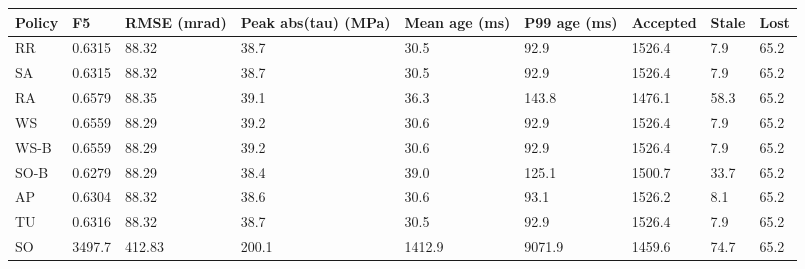\begin{tabular}{@{}lllllllll@{}}
\toprule
Policy & F5 & RMSE (mrad) & Peak abs(tau) (MPa) & Mean age (ms) & P99 age (ms) & Accepted & Stale & Lost \\
\midrule
RR & 0.6315 & 88.32 & 38.7 & 30.5 & 92.9 & 1526.4 & 7.9 & 65.2 \\
SA & 0.6315 & 88.32 & 38.7 & 30.5 & 92.9 & 1526.4 & 7.9 & 65.2 \\
RA & 0.6579 & 88.35 & 39.1 & 36.3 & 143.8 & 1476.1 & 58.3 & 65.2 \\
WS & 0.6559 & 88.29 & 39.2 & 30.6 & 92.9 & 1526.4 & 7.9 & 65.2 \\
WS-B & 0.6559 & 88.29 & 39.2 & 30.6 & 92.9 & 1526.4 & 7.9 & 65.2 \\
SO-B & 0.6279 & 88.29 & 38.4 & 39.0 & 125.1 & 1500.7 & 33.7 & 65.2 \\
AP & 0.6304 & 88.32 & 38.6 & 30.6 & 93.1 & 1526.2 & 8.1 & 65.2 \\
TU & 0.6316 & 88.32 & 38.7 & 30.5 & 92.9 & 1526.4 & 7.9 & 65.2 \\
SO & 3497.7 & 412.83 & 200.1 & 1412.9 & 9071.9 & 1459.6 & 74.7 & 65.2 \\
\bottomrule
\end{tabular}
